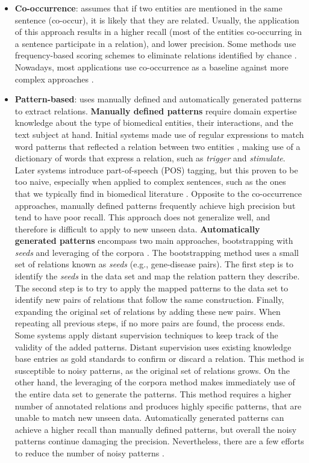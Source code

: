 \begin{itemize}

\item{\textbf{Co-occurrence}: assumes that if two entities are mentioned in the same sentence (co-occur), it is likely that they are related. Usually, the application of this approach results in a higher recall (most of the entities co-occurring in a sentence participate in a relation), and lower precision. Some methods use frequency-based scoring schemes to eliminate relations identified by chance \citep{10.1093/bib/bbm045}. Nowadays, most applications use co-occurrence as a baseline against more complex approaches \citep{bunescu-etal-2006-integrating}.}

\item{\textbf{Pattern-based}: uses manually defined and automatically generated patterns to extract relations. \textbf{Manually defined patterns} require domain expertise knowledge about the type of biomedical entities, their interactions, and the text subject at hand. Initial systems made use of regular expressions to match word patterns that reflected a relation between two entities \citep{Zhou2008}, making use of a dictionary of words that express a relation, such as \textit{trigger} and \textit{stimulate}. Later systems introduce part-of-speech (POS) tagging, but this proven to be too naive, especially when applied to complex sentences, such as the ones that we typically find in biomedical literature \citep{10.1093/bioinformatics/bti493}. Opposite to the co-occurrence approaches, manually defined patterns frequently achieve high precision but tend to have poor recall. This approach does not generalize well, and therefore is difficult to apply to new unseen data. \textbf{Automatically generated patterns} encompass two main approaches, bootstrapping with \textit{seeds} \citep{10.1093/bioinformatics/btr155} and leveraging of the corpora \citep{Liu:2011:GES:2107691.2107717}. The bootstrapping method uses a small set of relations known as \textit{seeds} (e.g., gene-disease pairs). The first step is to identify the \textit{seeds} in the data set and map the relation pattern they describe. The second step is to try to apply the mapped patterns to the data set to identify new pairs of relations that follow the same construction. Finally, expanding the original set of relations by adding these new pairs. When repeating all previous steps, if no more pairs are found, the process ends. Some systems apply distant supervision techniques to keep track of the validity of the added patterns. Distant supervision uses existing knowledge base entries as gold standards to confirm or discard a relation. This method is susceptible to noisy patterns, as the original set of relations grows. On the other hand, the leveraging of the corpora method makes immediately use of the entire data set to generate the patterns.  This method requires a higher number of annotated relations and produces highly specific patterns, that are unable to match new unseen data. Automatically generated patterns can achieve a higher recall than manually defined patterns, but overall the noisy patterns continue damaging the precision. Nevertheless, there are a few efforts to reduce the number of noisy patterns \citep{Nguyen2010}.}


\end{itemize}
